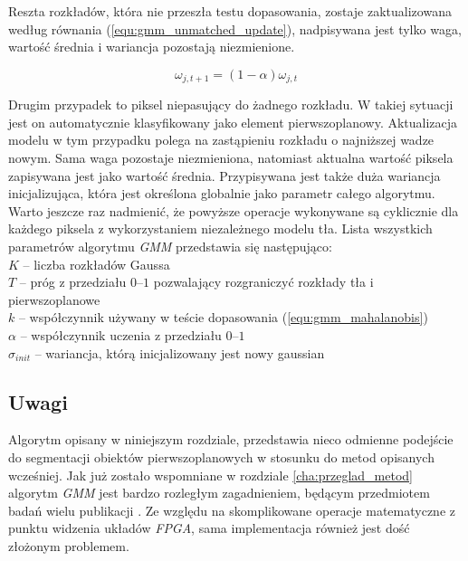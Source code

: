 Reszta rozkładów, która nie przeszła testu dopasowania, zostaje zaktualizowana według równania (\ref{equ:gmm_unmatched_update}), nadpisywana jest tylko waga, wartość średnia i wariancja pozostają niezmienione.

    \begin{equation}
        \omega_{j,t+1} = (1-\alpha)\omega_{j,t}
    \label{equ:gmm_unmatched_update}
    \end{equation}

Drugim przypadek to piksel niepasujący do żadnego rozkładu. 
W takiej sytuacji jest on automatycznie klasyfikowany jako element pierwszoplanowy. 
Aktualizacja modelu w tym przypadku polega na zastąpieniu rozkładu o najniższej wadze nowym. 
Sama waga pozostaje niezmieniona, natomiast aktualna wartość piksela zapisywana jest jako wartość średnia. Przypisywana jest także duża wariancja inicjalizująca, która jest określona globalnie jako parametr całego algorytmu. \\

Warto jeszcze raz nadmienić, że powyższe operacje wykonywane są cyklicznie dla każdego piksela z wykorzystaniem niezależnego modelu tła. 
Lista wszystkich parametrów algorytmu \textit{GMM} przedstawia się następująco: \\
\-\hspace{1cm} $K$ -- liczba rozkładów Gaussa\\
\-\hspace{1cm} $T$ -- próg z przedziału $0$--$1$ pozwalający rozgraniczyć rozkłady tła i pierwszoplanowe\\
\-\hspace{1cm} $k$ -- współczynnik używany w teście dopasowania (\ref{equ:gmm_mahalanobis})\\
\-\hspace{1cm} $\alpha$ -- współczynnik uczenia z przedziału $0$--$1$\\
\-\hspace{1cm} $\sigma_{init}$ -- wariancja, którą inicjalizowany jest nowy gaussian\\ 


\subsection{Uwagi}
\label{subsec:gmm_uwagi}

Algorytm opisany w niniejszym rozdziale, przedstawia nieco odmienne podejście do segmentacji obiektów pierwszoplanowych w stosunku do metod opisanych wcześniej. 
Jak już zostało wspomniane w rozdziale \ref{cha:przeglad_metod} algorytm \textit{GMM} jest bardzo rozległym zagadnieniem, będącym przedmiotem badań wielu publikacji \cite{Stauffer_Grimson_99, Genovese_Napoli_13, piszczek_15, wang_14}. 
Ze względu na skomplikowane operacje matematyczne z punktu widzenia układów \textit{FPGA}, sama implementacja również jest dość złożonym problemem.

